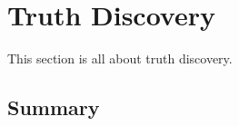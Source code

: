 \chapter{Truth Discovery}

This section is all about truth discovery. \lipsum[5]

\section{Summary}
